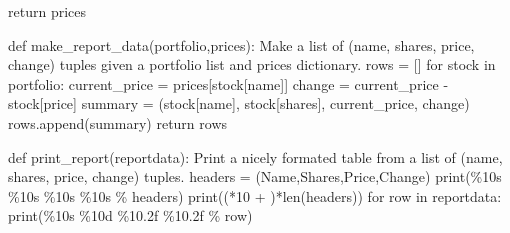 \documentclass[
  letterpaper,
  DIV=11,
  numbers=noendperiod]{scrreprt}
\newenvironment{Shaded}{\begin{snugshade}}{\end{snugshade}}
\newcommand{\BuiltInTok}[1]{\textcolor[rgb]{0.00,0.46,0.62}{#1}}
\newcommand{\CommentTok}[1]{\textcolor[rgb]{0.37,0.37,0.37}{#1}}
\newcommand{\ControlFlowTok}[1]{\textcolor[rgb]{0.00,0.46,0.62}{#1}}
\newcommand{\DecValTok}[1]{\textcolor[rgb]{0.68,0.00,0.00}{#1}}
\newcommand{\KeywordTok}[1]{\textcolor[rgb]{0.00,0.46,0.62}{#1}}
\newcommand{\NormalTok}[1]{\textcolor[rgb]{0.00,0.46,0.62}{#1}}
\newcommand{\OperatorTok}[1]{\textcolor[rgb]{0.37,0.37,0.37}{#1}}
\newcommand{\SpecialCharTok}[1]{\textcolor[rgb]{0.37,0.37,0.37}{#1}}
\newcommand{\StringTok}[1]{\textcolor[rgb]{0.13,0.47,0.30}{#1}}
\begin{document}
\begin{Shaded}
\begin{Highlighting}[]
    \ControlFlowTok{return}\NormalTok{ prices}

\KeywordTok{def}\NormalTok{ make\_report\_data(portfolio,prices):}
    \CommentTok{\textquotesingle{}\textquotesingle{}\textquotesingle{}}
\CommentTok{    Make a list of (name, shares, price, change) tuples given a portfolio list}
\CommentTok{    and prices dictionary.}
\CommentTok{    \textquotesingle{}\textquotesingle{}\textquotesingle{}}
\NormalTok{    rows }\OperatorTok{=}\NormalTok{ []}
    \ControlFlowTok{for}\NormalTok{ stock }\KeywordTok{in}\NormalTok{ portfolio:}
\NormalTok{        current\_price }\OperatorTok{=}\NormalTok{ prices[stock[}\StringTok{\textquotesingle{}name\textquotesingle{}}\NormalTok{]]}
\NormalTok{        change }\OperatorTok{=}\NormalTok{ current\_price }\OperatorTok{{-}}\NormalTok{ stock[}\StringTok{\textquotesingle{}price\textquotesingle{}}\NormalTok{]}
\NormalTok{        summary }\OperatorTok{=}\NormalTok{ (stock[}\StringTok{\textquotesingle{}name\textquotesingle{}}\NormalTok{], stock[}\StringTok{\textquotesingle{}shares\textquotesingle{}}\NormalTok{], current\_price, change)}
\NormalTok{        rows.append(summary)}
    \ControlFlowTok{return}\NormalTok{ rows}

\KeywordTok{def}\NormalTok{ print\_report(reportdata):}
    \CommentTok{\textquotesingle{}\textquotesingle{}\textquotesingle{}}
\CommentTok{    Print a nicely formated table from a list of (name, shares, price, change) tuples.}
\CommentTok{    \textquotesingle{}\textquotesingle{}\textquotesingle{}}
\NormalTok{    headers }\OperatorTok{=}\NormalTok{ (}\StringTok{\textquotesingle{}Name\textquotesingle{}}\NormalTok{,}\StringTok{\textquotesingle{}Shares\textquotesingle{}}\NormalTok{,}\StringTok{\textquotesingle{}Price\textquotesingle{}}\NormalTok{,}\StringTok{\textquotesingle{}Change\textquotesingle{}}\NormalTok{)}
    \BuiltInTok{print}\NormalTok{(}\StringTok{\textquotesingle{}}\SpecialCharTok{\%10s}\StringTok{ }\SpecialCharTok{\%10s}\StringTok{ }\SpecialCharTok{\%10s}\StringTok{ }\SpecialCharTok{\%10s}\StringTok{\textquotesingle{}} \OperatorTok{\%}\NormalTok{ headers)}
    \BuiltInTok{print}\NormalTok{((}\StringTok{\textquotesingle{}{-}\textquotesingle{}}\OperatorTok{*}\DecValTok{10} \OperatorTok{+} \StringTok{\textquotesingle{} \textquotesingle{}}\NormalTok{)}\OperatorTok{*}\BuiltInTok{len}\NormalTok{(headers))}
    \ControlFlowTok{for}\NormalTok{ row }\KeywordTok{in}\NormalTok{ reportdata:}
        \BuiltInTok{print}\NormalTok{(}\StringTok{\textquotesingle{}}\SpecialCharTok{\%10s}\StringTok{ }\SpecialCharTok{\%10d}\StringTok{ }\SpecialCharTok{\%10.2f}\StringTok{ }\SpecialCharTok{\%10.2f}\StringTok{\textquotesingle{}} \OperatorTok{\%}\NormalTok{ row)}


\end{Highlighting}
\end{Shaded}
\end{document}
